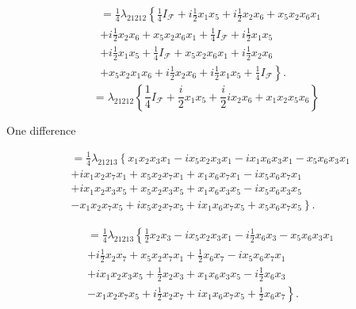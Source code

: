 \documentclass[aps, preprint]{revtex4}
\begin{document}
\begin{align} &  =\frac{1}{4} \lambda _{2 1 2 1 2}\left \{\frac{1}{4} I_{\mathcal{F}} +i \frac{1}{2} x_{1} x_{5} +i \frac{1}{2} x_{2} x_{6} +x_{5} x_{2} x_{6} x_{1}\right . \nonumber  \\
 &  +i \frac{1}{2} x_{2} x_{6} +x_{5} x_{2} x_{6} x_{1} +\frac{1}{4} I_{\mathcal{F}} +i \frac{1}{2} x_{1} x_{5} \nonumber  \\
 &  +i \frac{1}{2} x_{1} x_{5} +\frac{1}{4} I_{\mathcal{F}} +x_{5} x_{2} x_{6} x_{1} +i \frac{1}{2} x_{2} x_{6} \nonumber  \\
 &  +\left .x_{5} x_{2} x_{1} x_{6} +i \frac{1}{2} x_{2} x_{6} +i \frac{1}{2} x_{1} x_{5} +\frac{1}{4} I_{\mathcal{F}}\right \}\text{.}\end{align}
\begin{equation} =\lambda _{2 1 2 1 2} \left \{\frac{1}{4} I_{\mathcal{F}} +\frac{i}{2} x_{1} x_{5} +\frac{i}{2} i x_{2} x_{6} +x_{1} x_{2} x_{5} x_{6}\right \}
\end{equation}

\bigskip One difference 


\begin{align} &  =\frac{1}{4} \lambda _{2 1 2 1 3}\left \{x_{1} x_{2} x_{3} x_{1} -i x_{5} x_{2} x_{3} x_{1} -i x_{1} x_{6} x_{3} x_{1} -x_{5} x_{6} x_{3} x_{1}\right . \nonumber  \\
 &  +i x_{1} x_{2} x_{7} x_{1} +x_{5} x_{2} x_{7} x_{1} +x_{1} x_{6} x_{7} x_{1} -i x_{5} x_{6} x_{7} x_{1} \nonumber  \\
 &  +i x_{1} x_{2} x_{3} x_{5} +x_{5} x_{2} x_{3} x_{5} +x_{1} x_{6} x_{3} x_{5} -i x_{5} x_{6} x_{3} x_{5} \nonumber  \\
 & \left . -x_{1} x_{2} x_{7} x_{5} +i x_{5} x_{2} x_{7} x_{5} +i x_{1} x_{6} x_{7} x_{5} +x_{5} x_{6} x_{7} x_{5}\right \}\text{.}\end{align}


\begin{align} &  =\frac{1}{4} \lambda _{2 1 2 1 3}\left \{\frac{1}{2} x_{2} x_{3} -i x_{5} x_{2} x_{3} x_{1} -i \frac{1}{2} x_{6} x_{3} -x_{5} x_{6} x_{3} x_{1}\right . \nonumber  \\
 &  +i \frac{1}{2} x_{2} x_{7} +x_{5} x_{2} x_{7} x_{1} +\frac{1}{2} x_{6} x_{7} -i x_{5} x_{6} x_{7} x_{1} \nonumber  \\
 &  +i x_{1} x_{2} x_{3} x_{5} +\frac{1}{2} x_{2} x_{3} +x_{1} x_{6} x_{3} x_{5} -i \frac{1}{2} x_{6} x_{3} \nonumber  \\
 & \left . -x_{1} x_{2} x_{7} x_{5} +i \frac{1}{2} x_{2} x_{7} +i x_{1} x_{6} x_{7} x_{5} +\frac{1}{2} x_{6} x_{7}\right \}\text{.}\end{align}
\end{document}
